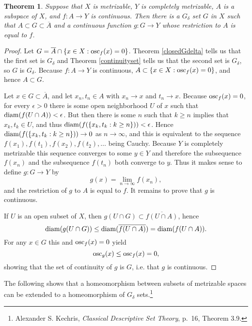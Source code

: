 \documentclass{article}
\newcommand{\diam}{\ensuremath\mathrm{diam}}
\newcommand{\osc}{\ensuremath\mathrm{osc}}
\newtheorem{theorem}{Theorem}
\theoremstyle{definition}
\begin{document}
\begin{theorem}
Suppose that $X$ is metrizable, $Y$ is completely metrizable, $A$ is a subspace of $X$, and $f:A \to Y$ is continuous. Then there is a $G_\delta$ set
$G$ in $X$ such that $A \subset G \subset \overline{A}$ and a continuous function $g:G \to Y$ whose restriction to $A$ is equal to $f$.
\label{kuratowski}
\end{theorem}
\begin{proof}
Let $G=\overline{A} \cap \{x \in X: \osc_f(x)=0\}$.
Theorem \ref{closedGdelta} tells us that the first set is $G_\delta$ and 
Theorem \ref{continuityset} tells us that the second set is $G_\delta$, so $G$ is $G_\delta$. Because $f:A \to Y$ is continuous,
$A \subset \{x \in X: \osc_f(x)=0\}$, and hence $A \subset G$.

Let $x \in G \subset \overline{A}$, and let $x_n, t_n \in A$ with $x_n \to x$ and $t_n \to x$. Because $\osc_f(x)=0$, 
for every $\epsilon>0$ there is some open neighborhood $U$ of $x$ such that 
$\diam(f(U \cap A))<\epsilon$. But then there is some $n$ such that $k \geq n$ implies that $x_k, t_k \in U$, and thus
$\diam(f(\{x_k,t_k: k \geq n\}))<\epsilon$. Hence
$\diam(f(\{x_k,t_k: k \geq n\})) \to 0$ as $n \to \infty$, and
this is equivalent to the sequence $f(x_1),f(t_1),f(x_2),f(t_2),\ldots$ being Cauchy. Because $Y$ is completely metrizable this sequence converges to some
$y \in Y$
and therefore the subsequence $f(x_n)$ and the subsequence $f(t_n)$ both converge to $y$.
Thus it makes sense to define $g:G \to Y$ by
\[
g(x) = \lim_{n \to \infty} f(x_n),
\]
and the restriction of $g$ to $A$ is equal to $f$.  It remains to prove that $g$ is continuous.

If $U$ is an open subset of $X$, then $g(U \cap G) \subset \overline{f(U \cap A)}$, hence
\[
\diam( g(U \cap G)) \leq \diam(\overline{f(U \cap A)}) = \diam(f(U \cap A)).
\]
For any $x \in G$ this and $\osc_f(x)=0$ yield
\[
\osc_g(x) \leq \osc_f(x) = 0,
\]
showing that the set of continuity of $g$ is $G$, i.e. that $g$ is continuous.
\end{proof}

The following shows that a homeomorphism between  subsets of metrizable spaces can be extended to a homeomorphism of
 $G_\delta$ sets.\footnote{Alexander S. Kechris, {\em Classical Descriptive Set Theory}, p.~16, Theorem 3.9.}
\end{document}
